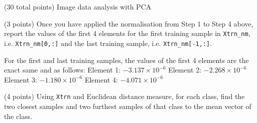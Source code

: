 \documentclass[12pt]{article}
\begin{document}
\clearpage
%
%

\begin{question}{(30 total points) Image data analysis with PCA}

  
  

  
  \medskip

  \begin{subquestion}{(3 points)
      Once you have applied the normalisation from Step 1 to Step 4 above,
      report the values of the first 4 elements for the first training
      sample in \texttt{Xtrn\_nm},
      i.e. \texttt{Xtrn\_nm[0,:]} and the last training sample,
      i.e. \texttt{Xtrn\_nm[-1,:]}.
    } \label{Q1.1}
    

      \begin{answerbox}{10em}
         For the first and last training samples, the values of the first 4 elements are the exact same and as follows:\newline
         Element 1: $-3.137\times10^{-6}$\newline
         Element 2: $-2.268\times10^{-6}$\newline
         Element 3: $-1.180\times10^{-6}$\newline
         Element 4: $-4.071\times10^{-6}$\newline
      \end{answerbox}
  


   \end{subquestion}
   \begin{subquestion}{(4 points)
      Using {\tt Xtrn} and Euclidean distance
      measure, for each class,
      find the two closest samples and two furthest
      samples of that class to the mean vector of the class.
    }  \label{Q1.2}





\end{subquestion}
\end{question}
\end{document}
